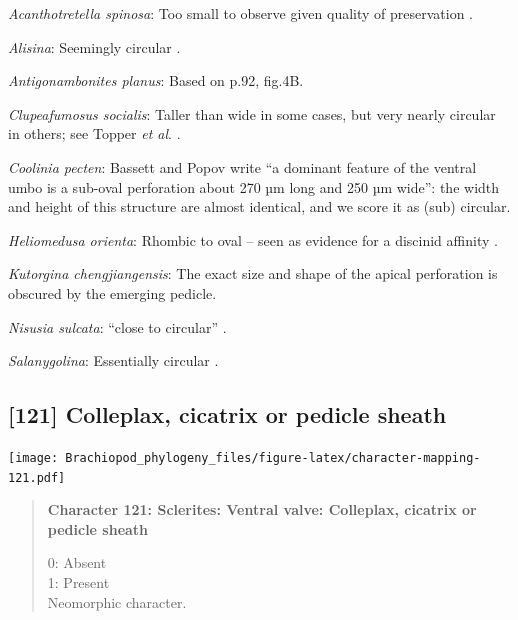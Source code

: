 \documentclass[openany]{book}
\begin{document}
\hypertarget{Acanthotretella_spinosa-coding-120}{}
\emph{Acanthotretella spinosa}: Too small to observe given quality of
preservation \citep{Holmer2006Aspinose}.

\hypertarget{Alisina-coding-120}{}
\emph{Alisina}: Seemingly circular \citep{Zhang2011Anobolellate}.

\hypertarget{Antigonambonites_planus-coding-120}{}
\emph{Antigonambonites planus}: Based on p.92, fig.4B.

\hypertarget{Clupeafumosus_socialis-coding-120}{}
\emph{Clupeafumosus socialis}: Taller than wide in some cases, but very
nearly circular in others; see Topper \emph{et al}.
\citeyearpar{Topper2013Reappraisalof}.

\hypertarget{Coolinia_pecten-coding-120}{}
\emph{Coolinia pecten}: Bassett and Popov write ``a dominant feature of
the ventral umbo is a sub-oval perforation about 270 µm long and 250 µm
wide'': the width and height of this structure are almost identical, and
we score it as (sub) circular.

\hypertarget{Heliomedusa_orienta-coding-120}{}
\emph{Heliomedusa orienta}: Rhombic to oval -- seen as evidence for a
discinid affinity \citep{Chen2007Reinterpretationof}.

\hypertarget{Kutorgina_chengjiangensis-coding-120}{}
\emph{Kutorgina chengjiangensis}: The exact size and shape of the apical
perforation is obscured by the emerging pedicle.

\hypertarget{Nisusia_sulcata-coding-120}{}
\emph{Nisusia sulcata}: ``close to circular''
\citep{Holmer2018Evolutionarysignificance}.

\hypertarget{Salanygolina-coding-120}{}
\emph{Salanygolina}: Essentially circular \citep[fig.
4]{Holmer2009Theenigmatic}.

\subsection*{{[}121{]} Colleplax, cicatrix or pedicle
sheath}\label{colleplax-cicatrix-or-pedicle-sheath}

\texttt{[image: Brachiopod\_phylogeny\_files/figure-latex/character-mapping-121.pdf]}

\begin{quote}
\textbf{Character 121: Sclerites: Ventral valve: Colleplax, cicatrix or
pedicle sheath}

0: Absent\\
1: Present\\
Neomorphic character.
\end{quote}
\end{document}
